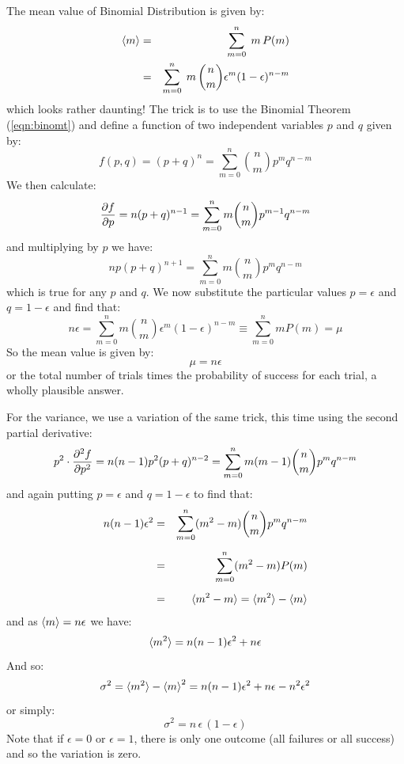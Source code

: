 \documentclass[12pt,oneside]{book}
\begin{document}
The mean value of Binomial Distribution is given by:
\begin{eqnarray*}
\braket{m} &=& \sum_{m=0}^n \; m \, P(m) \\
&=& \sum_{m=0}^n \; m \, \binom{n}{m} \epsilon^m (1-\epsilon)^{n-m} \\
\end{eqnarray*}
which looks rather daunting!  The trick is to use the Binomial Theorem (\ref{eqn:binomt}) and define a function of two independent variables $p$ and $q$ given by:
\begin{displaymath}
f(p,q) = (p+q)^n = \sum_{m=0}^n \binom{n}{m} p^m q^{n-m}
\end{displaymath}
We then calculate:
\begin{displaymath}
\frac{\partial f}{\partial p} = n(p+q)^{n-1} = \sum_{m=0}^n m \binom{n}{m} p^{m-1} q^{n-m} \\
\end{displaymath}
and multiplying by $p$ we have:
\begin{displaymath}
np(p+q)^{n+1} = \sum_{m=0}^n m \binom{n}{m} p^m q^{n-m}
\end{displaymath}
which is true for any $p$ and $q$.  We now substitute the particular values $p=\epsilon$ and $q=1-\epsilon$ and find that:
\begin{displaymath}
n \epsilon = \sum_{m=0}^n m \binom{n}{m} \epsilon^m (1-\epsilon)^{n-m} \equiv \sum_{m=0}^n m P(m) = \mu
\end{displaymath}
So the mean value is given by:
\begin{equation}
\mu = n \epsilon
\end{equation}
or the total number of trials times the probability of success for each trial, a wholly plausible answer.

For the variance, we use a variation of the same trick, this time using the second partial derivative:
\begin{displaymath}
p^2 \cdot \frac{\partial^2 f}{\partial p^2} = n(n-1)p^2(p+q)^{n-2} = \sum_{m=0}^n m (m-1) \binom{n}{m} p^{m} q^{n-m} \\
\end{displaymath}
and again putting $p=\epsilon$ and $q=1-\epsilon$ to find that:
\begin{eqnarray*}
n(n-1)\epsilon^2 &=& \sum_{m=0}^n (m^2 -m) \binom{n}{m} p^{m} q^{n-m} \\[5pt]
&=& \sum_{m=0}^n (m^2 -m) P(m) \\[5pt]
&=& \braket{m^2-m} = \braket{m^2}-\braket{m}
\end{eqnarray*}
and as $\braket{m} = n \epsilon$ we have:
\begin{displaymath}
\braket{m^2} = n(n-1)\epsilon^2 + n \epsilon
\end{displaymath}
And so:
\begin{displaymath}
\sigma^2 = \braket{m^2} - \braket{m}^2 = n(n-1)\epsilon^2 + n \epsilon - n^2\epsilon^2
\end{displaymath}
or simply:
\begin{equation}
\sigma^2 = n \, \epsilon \, (1 - \epsilon)
\end{equation}
Note that if $\epsilon=0$ or $\epsilon=1$, there is only one outcome (all failures or all success) and so the variation is zero.
\end{document}
